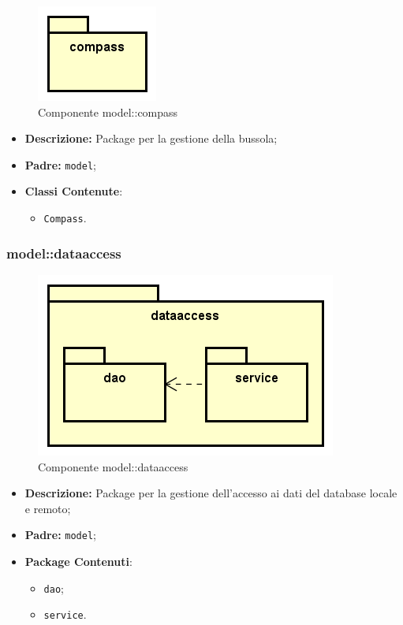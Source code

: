 \documentclass[../DefinizioneDiProdotto.tex]{subfiles}
\begin{document}
    \begin{figure}[H]
        \centering
        \includegraphics{img/package/compass.png}
        \caption{Componente model::\-compass}\label{fig:model::compass} 
    \end{figure}
    \begin{itemize}
\item \textbf{Descrizione:} Package per la gestione della bussola;
\item \textbf{Padre:} \texttt{model};
\item \textbf{Classi Contenute}:
\begin{itemize}
\item \texttt{Compass}.

\end{itemize}
\end{itemize}

\subsubsection{model::\-dataaccess}

    \begin{figure}[H]
        \centering
        \includegraphics{img/package/dataaccess.png}
        \caption{Componente model::\-dataaccess}\label{fig:model::dataaccess} 
    \end{figure}
    \begin{itemize}
\item \textbf{Descrizione:} Package per la gestione dell'accesso ai dati del database locale e remoto;
\item \textbf{Padre:} \texttt{model};
\item \textbf{Package Contenuti}:
\begin{itemize}
\item \texttt{dao};

\item \texttt{service}.

\end{itemize}
\end{itemize}
\end{document}
